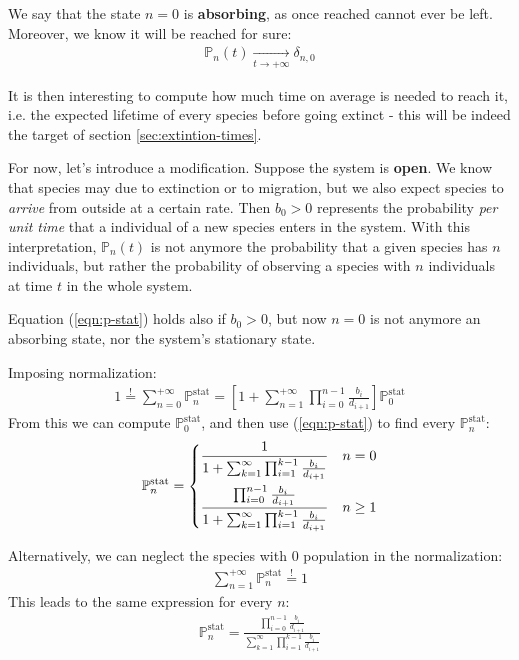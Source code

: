 \documentclass[../../main.tex]{subfiles}
\begin{document}
\medskip

We say that the state $n=0$ is \textbf{absorbing}, as once reached cannot ever be left. Moreover, we know it will be reached for sure:
\begin{align*}
    \mathbb{P}_n(t)  \xrightarrow[t \to +\infty]{}  \delta_{n,0}
\end{align*}

It is then interesting to compute how much time on average is needed to reach it, i.e. the expected lifetime of every species before going extinct - this will be indeed the target of section \ref{sec:extintion-times}.

\medskip

For now, let's introduce a modification. Suppose the system is \textbf{open}. We know that species may  due to extinction or to migration, but we also expect species to \textit{arrive} from outside at a certain rate.
Then $b_0 > 0$ represents the probability \textit{per unit time} that a individual of a new species enters in the system. With this interpretation, $\mathbb{P}_n(t)$ is not anymore the probability that a given species has $n$ individuals, but rather the probability of observing a  species with $n$ individuals at time $t$ in the whole system. 

\medskip

Equation (\ref{eqn:p-stat}) holds also if $b_0 > 0$, but now $n=0$ is not anymore an absorbing state, nor the system's stationary state. 

Imposing normalization:
\begin{align*}
    1 \overset{!}{=} \sum_{n=0}^{+\infty} \mathbb{P}_n^{\mathrm{stat}} = \left[1+ \sum_{n=1}^{+\infty} \prod_{i=0}^{n-1} \frac{b_i}{d_{i+1}} \right] \mathbb{P}_0^{\mathrm{stat}}
\end{align*}
From this we can compute $\mathbb{P}_0^{\mathrm{stat}}$, and then use (\ref{eqn:p-stat}) to find every $\mathbb{P}_n^{\mathrm{stat}}$:
\begin{align*}
    \mathbb{P}_n^{\mathrm{stat}} = \begin{dcases}
        \frac{1}{1+ \sum_{k=1}^\infty \prod_{i=1}^{k-1} \frac{b_i}{d_{i+1}}} & n = 0\\
        \frac{\prod_{i=0}^{n-1} \frac{b_i}{d_{i+1}} }{1 + \sum_{k=1}^\infty \prod_{i=1}^{k-1} \frac{b_i}{d_{i+1}} }  & n \geq 1
    \end{dcases}
\end{align*}

Alternatively, we can neglect the species with $0$ population in the normalization:
\begin{align*}
    \sum_{n=1}^{+\infty} \mathbb{P}_{n}^{\mathrm{stat}} \overset{!}{=} 1
\end{align*}
This leads to the same expression for every $n$:
\begin{align}\label{eqn:p-stat2}
    \mathbb{P}_{n}^{\mathrm{stat}} = \frac{\displaystyle \prod_{i=0}^{n-1} \frac{b_i}{d_{i+1}}}{\displaystyle \sum_{k=1}^\infty \prod_{i=1}^{k-1} \frac{b_i}{d_{i+1}} }   
\end{align}
\end{document}
